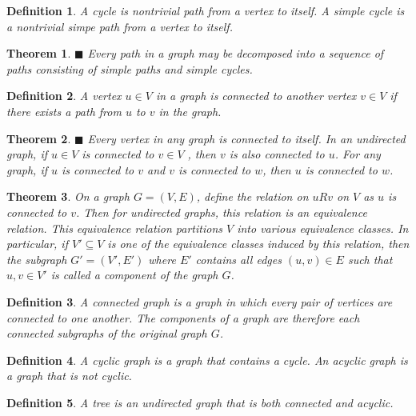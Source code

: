\documentclass[a4paper]{article}
\newtheorem{mytheorem}{Theorem}
\newtheorem{mydef}{Definition}
\numberwithin{mytheorem}{section}
\numberwithin{mydef}{section}
\numberwithin{example}{section}
\newcommand{\done}{$\blacksquare$ }
\begin{document}
\begin{mydef} A cycle is nontrivial path from a vertex to itself. A simple cycle is a nontrivial simpe path from a vertex to itself. 
\end{mydef}

\begin{mytheorem} \done Every path in a graph may be decomposed into a sequence of paths consisting of simple paths and simple cycles. \end{mytheorem}

\begin{mydef} A vertex $u \in V$ in a graph is connected to another vertex $v \in V$ if there exists a path from $u$ to $v$ in the graph. 
\end{mydef}

\begin{mytheorem} \done Every vertex in any graph is connected to itself. In an undirected graph, if $u \in V$ is connected to $v \in V$ , then $v$ is also connected to $u$. For any graph, if $u$ is connected to $v$ and $v$ is connected to $w$, then $u$ is connected to $w$.  \end{mytheorem}

\begin{mytheorem} On a graph $G = (V,E)$, define the relation on $u R v$ on $V$ as $u$ is connected to $v$. Then for undirected graphs, this relation is an equivalence relation. This equivalence relation partitions $V$ into various equivalence classes. In particular, if $V' \subseteq V$ is one of the equivalence classes induced by this relation, then the subgraph $G' = (V',E')$ where $E'$ contains all edges $(u,v) \in E$ such that $u,v \in V'$ is called a component of the graph $G$. \end{mytheorem}

\begin{mydef} A connected graph is a graph in which every pair of vertices are connected to one another. The components of a graph are therefore each connected subgraphs of the original graph $G$. 
\end{mydef}

\begin{mydef} A cyclic graph is a graph that contains a cycle. An acyclic graph is a graph that is not cyclic.
\end{mydef}

\begin{mydef} A tree is an undirected graph that is both connected and acyclic. 
\end{mydef}
\end{document}
